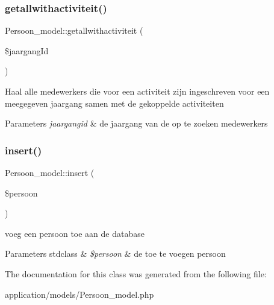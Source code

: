 \subsubsection{\texorpdfstring{getallwithactiviteit()}{getallwithactiviteit()}}
{\footnotesize\ttfamily Persoon\+\_\+model\+::getallwithactiviteit (\begin{DoxyParamCaption}\item[{}]{\$jaargang\+Id }\end{DoxyParamCaption})}

Haal alle medewerkers die voor een activiteit zijn ingeschreven voor een meegegeven jaargang samen met de gekoppelde activiteiten 
\begin{DoxyParams}{Parameters}
{\em jaargangid} & de jaargang van de op te zoeken medewerkers \\
\hline
\end{DoxyParams}
\mbox{\label{class_persoon__model_a2c311e5cb508141c1bae2566b3169615}} 
\subsubsection{\texorpdfstring{insert()}{insert()}}
{\footnotesize\ttfamily Persoon\+\_\+model\+::insert (\begin{DoxyParamCaption}\item[{}]{\$persoon }\end{DoxyParamCaption})}

voeg een persoon toe aan de database 
\begin{DoxyParams}[1]{Parameters}
stdclass & {\em \$persoon} & de toe te voegen persoon \\
\hline
\end{DoxyParams}


The documentation for this class was generated from the following file\+:\begin{DoxyCompactItemize}
\item 
application/models/Persoon\+\_\+model.\+php\end{DoxyCompactItemize}
